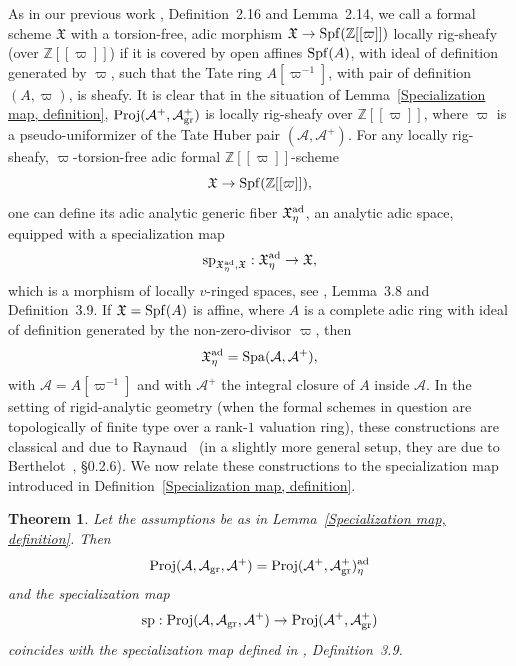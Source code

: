 \documentclass[12pt,twoside,a4paper]{article}
\newtheorem{thm}{Theorem}[section]
\theoremstyle{definition}
\theoremstyle{remark}
\newcommand\ad{{\rm ad}}
\newcommand\gr{{\rm gr}}
\newcommand\Proj{{\rm Proj}}
\newcommand\spc{{\rm sp}}
\newcommand\Spa{{\rm Spa}}
\newcommand\Spf{{\rm Spf}}
\begin{document}
As in our previous work \cite{Dine25-2}, Definition~2.16 and Lemma~2.14, we call a formal scheme $\mathfrak{X}$ with a torsion-free, adic morphism $\mathfrak{X}\to \Spf(\mathbb{Z}[[\varpi]])$ locally rig-sheafy (over $\mathbb{Z}[[\varpi]]$) if it is covered by open affines $\Spf(A)$, with ideal of definition generated by $\varpi$, such that the Tate ring $A[\varpi^{-1}]$, with pair of definition $(A, \varpi)$, is sheafy. It is clear that in the situation of Lemma~\ref{Specialization map, definition}, $\Proj(\mathcal{A}^{+}, \mathcal{A}_{\gr}^{+})$ is locally rig-sheafy over $\mathbb{Z}[[\varpi]]$, where $\varpi$ is a pseudo-uniformizer of the Tate Huber pair $(\mathcal{A}, \mathcal{A}^{+})$. For any locally rig-sheafy, $\varpi$-torsion-free adic formal $\mathbb{Z}[[\varpi]]$-scheme \begin{equation*}\mathfrak{X}\to \Spf(\mathbb{Z}[[\varpi]]),\end{equation*}one can define its adic analytic generic fiber $\mathfrak{X}_{\eta}^{\ad}$, an analytic adic space, equipped with a specialization map \begin{equation*}\spc_{\mathfrak{X}_{\eta}^{\ad}, \mathfrak{X}}: \mathfrak{X}_{\eta}^{\ad}\to \mathfrak{X},\end{equation*}which is a morphism of locally $v$-ringed spaces, see \cite{Dine25-2}, Lemma~3.8 and Definition~3.9. If $\mathfrak{X}=\Spf(A)$ is affine, where $A$ is a complete adic ring with ideal of definition generated by the non-zero-divisor $\varpi$, then \begin{equation*}\mathfrak{X}_{\eta}^{\ad}=\Spa(\mathcal{A}, \mathcal{A}^{+}),\end{equation*}with $\mathcal{A}=A[\varpi^{-1}]$ and with $\mathcal{A}^{+}$ the integral closure of $A$ inside $\mathcal{A}$. In the setting of rigid-analytic geometry (when the formal schemes in question are topologically of finite type over a rank-$1$ valuation ring), these constructions are classical and due to Raynaud~\cite{RaynaudReport} (in a slightly more general setup, they are due to Berthelot~\cite{Berthelot96}, \S0.2.6). We now relate these constructions to the specialization map introduced in Definition~\ref{Specialization map, definition}.   
\begin{thm}\label{Two specialization maps}Let the assumptions be as in Lemma~\ref{Specialization map, definition}. Then \begin{equation*}\Proj(\mathcal{A}, \mathcal{A}_{\gr}, \mathcal{A}^{+})=\Proj(\mathcal{A}^{+}, \mathcal{A}_{\gr}^{+})_{\eta}^{\ad}\end{equation*}and the specialization map \begin{equation*}\spc: \Proj(\mathcal{A}, \mathcal{A}_{\gr}, \mathcal{A}^{+})\to \Proj(\mathcal{A}^{+}, \mathcal{A}_{\gr}^{+})\end{equation*}coincides with the specialization map defined in \cite{Dine25-2}, Definition~3.9. \end{thm}
\end{document}
